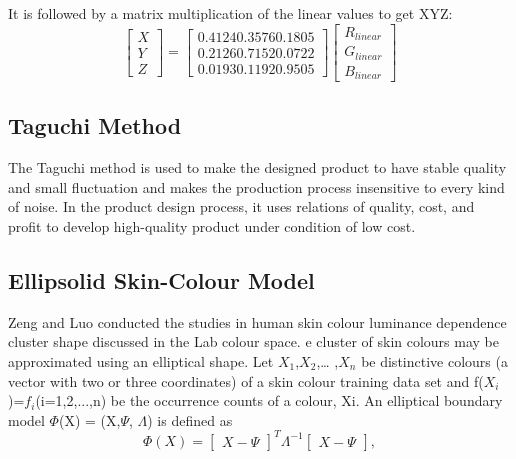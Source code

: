 \documentclass[acmsmall]{acmart}
\begin{document}
\! It is followed by a matrix multiplication of the linear values to get XYZ:
\begin{equation} \label{2}
\begin{bmatrix}
X\\
Y\\
Z
\end{bmatrix} =
\begin{bmatrix}
0.41240.35760.1805\\
0.21260.71520.0722\\
0.01930.11920.9505
\end{bmatrix}
\begin{bmatrix}
R_{linear}\\
G_{linear}\\
B_{linear}
\end{bmatrix}
\end{equation}



\subsection{Taguchi Method}
The Taguchi method is used to make the designed product to have stable quality and small fluctuation and makes the production process insensitive to every kind of noise. In the product design process, it uses relations of quality, cost, and profit to develop high-quality product under condition of low cost. 

\subsection{Ellipsolid Skin-Colour Model}
Zeng and Luo conducted the studies in human skin colour luminance dependence cluster shape discussed in the Lab colour space. e cluster of skin colours may be approximated using an elliptical shape. Let $X_{1}$,$X_{2}$,… ,$X_{n}$ be distinctive colours (a vector with two or three coordinates) of a skin colour training data set and f($X_{i}$ )=$f_{i}$(i=1,2,...,n) be the occurrence counts of a colour, Xi. An elliptical boundary model $\Phi$(X) = (X,$\Psi$, $\Lambda$) is defined as
\begin{equation} 
\Phi(X)=
\begin{bmatrix}
X-\Psi
\end{bmatrix}^{T}
\Lambda^{-1}
\begin{bmatrix}
X-\Psi
\end{bmatrix},
\end{equation}
\end{document}

